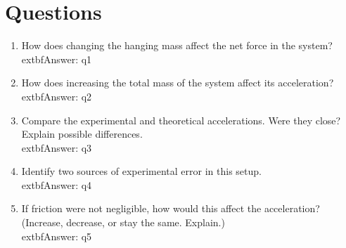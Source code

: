 \documentclass[12pt]{article}
\begin{document}
\section*{Questions}

\begin{enumerate}[label=\arabic*.]
    \item How does changing the hanging mass affect the net force in the system?\\
    	extbf{Answer:} {{ q1 }} %

    \item How does increasing the total mass of the system affect its acceleration?\\
    	extbf{Answer:} {{ q2 }} %

    \item Compare the experimental and theoretical accelerations. Were they close? Explain possible differences.\\
    	extbf{Answer:} {{ q3 }} %

    \item Identify two sources of experimental error in this setup.\\
    	extbf{Answer:} {{ q4 }} %

    \item If friction were not negligible, how would this affect the acceleration? (Increase, decrease, or stay the same. Explain.)\\
    	extbf{Answer:} {{ q5 }} %
\end{enumerate}
\end{document}

